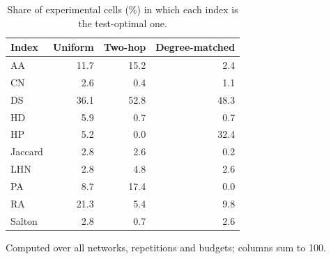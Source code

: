 \begin{table}[htbp]
\centering
\footnotesize
\caption{Share of experimental cells (\%) in which each index is the test-optimal one.}
\label{tab:oracle}
\begin{tabular}{l r r r}
\toprule
Index & Uniform & Two-hop & Degree-matched \\
\midrule
AA & 11.7 & 15.2 & 2.4 \\
CN & 2.6 & 0.4 & 1.1 \\
DS & 36.1 & 52.8 & 48.3 \\
HD & 5.9 & 0.7 & 0.7 \\
HP & 5.2 & 0.0 & 32.4 \\
Jaccard & 2.8 & 2.6 & 0.2 \\
LHN & 2.8 & 4.8 & 2.6 \\
PA & 8.7 & 17.4 & 0.0 \\
RA & 21.3 & 5.4 & 9.8 \\
Salton & 2.8 & 0.7 & 2.6 \\
\bottomrule
\end{tabular}
\par\vspace{2pt}\begin{minipage}{\linewidth}\footnotesize Computed over all networks, repetitions and budgets; columns sum to 100.\end{minipage}
\end{table}
